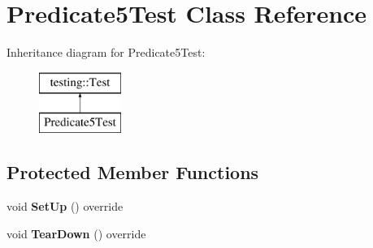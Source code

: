 \hypertarget{classPredicate5Test}{}\section{Predicate5\+Test Class Reference}
\label{classPredicate5Test}
Inheritance diagram for Predicate5\+Test\+:\begin{figure}[H]
\begin{center}
\leavevmode
\includegraphics[height=2.000000cm]{classPredicate5Test}
\end{center}
\end{figure}
\subsection*{Protected Member Functions}
\begin{DoxyCompactItemize}
\item 
\mbox{\label{classPredicate5Test_a699fbdc25f5eeb2e810887a60a4b3c1b}} 
void {\bfseries Set\+Up} () override
\item 
\mbox{\label{classPredicate5Test_aab641802c35a2a90f8db0b04dc0c6064}} 
void {\bfseries Tear\+Down} () override
\end{DoxyCompactItemize}
